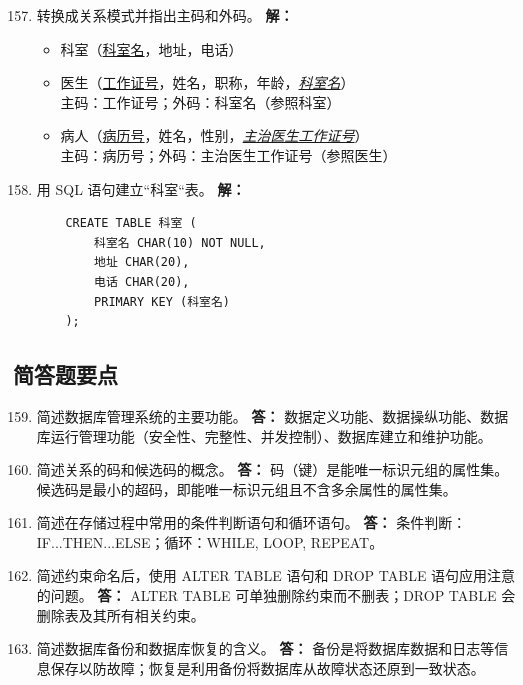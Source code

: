 \documentclass[12pt, a4paper]{article}
\begin{document}
\begin{enumerate}[label=\arabic*.]
    \setcounter{enumi}{156}
    \item 转换成关系模式并指出主码和外码。
    \textbf{解：}
    \begin{itemize}
        \item 科室（\underline{科室名}，地址，电话）
        \item 医生（\underline{工作证号}，姓名，职称，年龄，\underline{\textit{科室名}}） \\
        主码：工作证号；外码：科室名（参照科室）
        \item 病人（\underline{病历号}，姓名，性别，\underline{\textit{主治医生工作证号}}） \\
        主码：病历号；外码：主治医生工作证号（参照医生）
    \end{itemize}

    \item 用 SQL 语句建立“科室“表。
    \textbf{解：}
    \begin{verbatim}
    CREATE TABLE 科室 (
        科室名 CHAR(10) NOT NULL,
        地址 CHAR(20),
        电话 CHAR(20),
        PRIMARY KEY (科室名)
    );
    \end{verbatim}
\end{enumerate}

\subsection*{简答题要点}
\begin{enumerate}[label=\arabic*.]
    \setcounter{enumi}{158}
    \item 简述数据库管理系统的主要功能。
    \textbf{答：} 数据定义功能、数据操纵功能、数据库运行管理功能（安全性、完整性、并发控制）、数据库建立和维护功能。

    \item 简述关系的码和候选码的概念。
    \textbf{答：} 码（键）是能唯一标识元组的属性集。候选码是最小的超码，即能唯一标识元组且不含多余属性的属性集。

    \item 简述在存储过程中常用的条件判断语句和循环语句。
    \textbf{答：} 条件判断：IF...THEN...ELSE；循环：WHILE, LOOP, REPEAT。

    \item 简述约束命名后，使用 ALTER TABLE 语句和 DROP TABLE 语句应用注意的问题。
    \textbf{答：} ALTER TABLE 可单独删除约束而不删表；DROP TABLE 会删除表及其所有相关约束。

    \item 简述数据库备份和数据库恢复的含义。
    \textbf{答：} 备份是将数据库数据和日志等信息保存以防故障；恢复是利用备份将数据库从故障状态还原到一致状态。
\end{enumerate}
\end{document}
